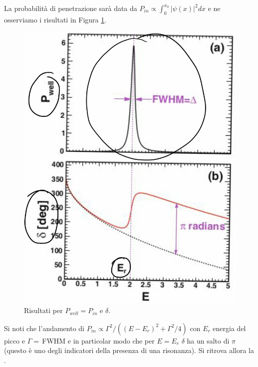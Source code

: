 La probabilità di penetrazione sarà data da $P_{in}\propto \int_0^{x_0} |\psi(x)|^2 dx$ e ne osserviamo i risultati in Figura \ref{0325_ris3}.
\begin{figure}[h]
    \centering
    \includegraphics[scale=0.4]{Immagini/0325_risonanza3.png}
    \caption{Risultati per $P_{well} = P_{in}$ e $\delta$.}
    \label{0325_ris3}
\end{figure}
\noindent Si noti che l'andamento di $P_{in}\propto \Gamma^2/((E-E_r)^2+\Gamma^2/4)$ con $E_r$ energia del picco e $\Gamma = \,$FWHM e in particolar modo che per $E=E_r$ $\delta$ ha un salto di $\pi$ (questo è uno degli indicatori della presenza di una risonanza). Si ritrova allora la \BW{}.

\newpage

